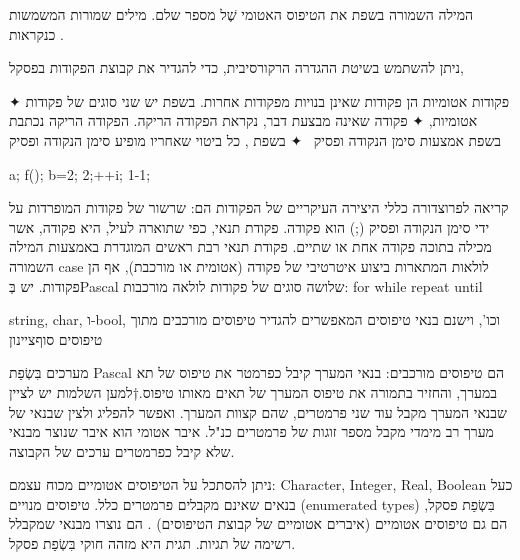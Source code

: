 המילה השמורה  בשפת   את הטיפוס האטומי שֶׁל מספר שלם.  מילים
שמורות המשמשות כ נקראות .

ניתן להשתמש בשיטת ההגדרה הרקורסיבית, כדי להגדיר את קבוצת הפקודות בפסקל,

✦  פקודות אטומיות הן פקודות שאינן בנויות מפקודות אחרות. בשפת  יש שני סוגים של פקודות אטומיות,
✦  פקודה שאינה מבצעת דבר, נקראת הפקודה הריקה. הפקודה הריקה נכתבת בשפת אמצעות סימן הנקודה ופסיק~\cc{;}
✦  בשפת , כל ביטוי שאחריו מופיע סימן הנקודה ופסיק~\cc{;}
\begin{CPP}
  a; f(); b=2; 2;++i; 1-1;
\end{CPP}
קריאה לפרוצדורה
כללי היצירה העיקריים של הפקודות הם:
שרשור של פקודות המופרדות על ידי סימן הנקודה ופסיק (;) הוא פקודה.
פקודת תנאי, כפי שתוארה לעיל, היא פקודה, אשר מכילה בתוכה פקודה אחת או שתיים.
פקודת תנאי רבת ראשים המוגדרת באמצעות המילה השמורה case
לולאות המתארות ביצוע איטרטיבי של פקודה (אטומית או מורכבת), אף הן פקודות. יש בְּPascal שלושה סוגים של פקודות לולאה מורכבות:
for
while
repeat until

string, char, ו-bool,
וכו', וישנם בנאי טיפוסים המאפשרים להגדיר טיפוסים מורכבים מתוך טיפוסים
סוף{ציינון}

מערכים בִּשְׂפַת Pascal הם טיפוסים מורכבים: בנאי המערך קיבל כפרמטר את טיפוס של תא
במערך, והחזיר בתמורה את טיפוס המערך של תאים מאותו טיפוס.†{למען השלמות יש לציין
שבנאי המערך מקבל עוד שני פרמטרים, שהם קצוות המערך. ואפשר להפליג ולצין שבנאי של
מערך רב מימדי מקבל מספר זוגות של פרמטרים כנ"ל.}
איבר אטומי הוא איבר שנוצר מבנאי שלא קיבל כפרמטרים ערכים של הקבוצה.

ניתן להסתכל על הטיפוסים אטומיים מכוח עצמם: Character, Integer, Real, Boolean
כעל בנאים שאינם מקבלים פרמטרים כלל. טיפוסים מנויים (enumerated types) בִּשְׂפַת
פסקל, הם גם טיפוסים אטומיים (איברים אטומיים של קבוצת הטיפוסים) . הם נוצרו מבנאי
שמקבלל רשימה של תגיות. תגית היא מזהה חוקי בִּשְׂפַת פסקל.
